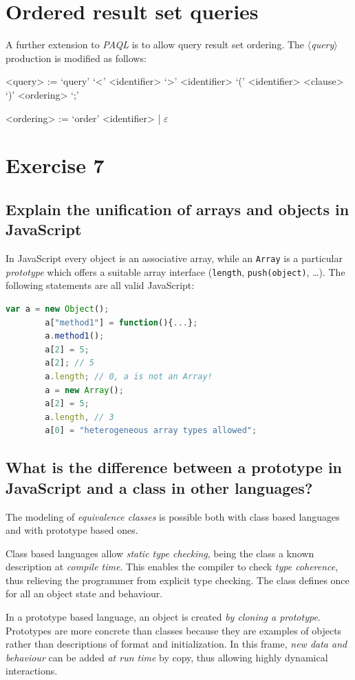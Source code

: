 \documentclass[10pt]{article}  %
\begin{document}
\section{Ordered result set queries}
    A further extension to \emph{PAQL} is to allow query result set ordering. The $\langle$\emph{query}$\rangle$ production is modified as follows:
    \vspace{1em}
    \begin{mdframed}
        \begin{grammar}
            <query> := `query' `<' <identifier> `>' <identifier> `(' <identifier> <clause> `)' <ordering> `;'

            <ordering> := `order' <identifier> | $\varepsilon$
        \end{grammar}
    \end{mdframed}
    \vspace{1em}
\section{Exercise 7}
    \subsection{Explain the unification of arrays and objects in JavaScript}
    In JavaScript every object is an associative array, while an \texttt{Array} is a particular \emph{prototype}
    which offers a suitable array interface (\texttt{length}, \texttt{push(object)}, \ldots).
    The following statements are all valid JavaScript:
    \begin{lstlisting}[language=JavaScript]
        var a = new Object();
        a["method1"] = function(){...};
        a.method1();
        a[2] = 5;
        a[2]; // 5
        a.length; // 0, a is not an Array!
        a = new Array();
        a[2] = 5;
        a.length, // 3
        a[0] = "heterogeneous array types allowed";
    \end{lstlisting}
    \subsection{What is the difference between a prototype in JavaScript and a class in other languages?}
    The modeling of \emph{equivalence classes} is possible both with class based languages and with prototype based ones.

    Class based languages allow \emph{static type checking}, being the class a known description at \emph{compile time}.
    This enables the compiler to check \emph{type coherence}, thus relieving the programmer from explicit type checking.
    The class defines once for all an object state and behaviour.

    In a prototype based language, an object is created \emph{by cloning  a prototype}. Prototypes are more concrete
    than classes because they are examples of objects rather than descriptions of format and initialization.
    In this frame, \emph{new data and behaviour} can be added \emph{at run time} by copy, thus allowing highly dynamical interactions.


\end{document}
